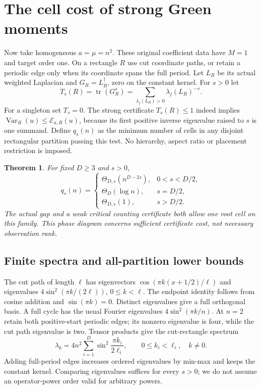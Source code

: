 \documentclass[11pt]{article}
\newtheorem{theorem}{Theorem}[section]
\newcommand{\Var}{\operatorname{Var}}
\newcommand{\tr}{\operatorname{tr}}
\newcommand{\E}{\mathcal E}
\begin{document}
\section{The cell cost of strong Green moments}
Now take homogeneous $a=\mu=n^2$. These original coefficient data have
$M=1$ and target order one. On a rectangle $R$ use cut coordinate paths,
or retain a periodic edge only when its coordinate spans the full period.
Let $L_R$ be its actual weighted Laplacian and $G_R=L_R^\dagger$, zero
on the constant kernel. For $s>0$ let
\[
 T_s(R)=\tr(G_R^s)=\sum_{\lambda_j(L_R)>0}\lambda_j(L_R)^{-s}.
\]
For a singleton set $T_s=0$. The strong certificate $T_s(R)\le1$ indeed
implies $\Var_R(u)\le\E_{a,R}(u)$, because its first positive inverse
eigenvalue raised to $s$ is one summand. Define $q_s(n)$ as the minimum
number of cells in any disjoint rectangular partition passing this test.
No hierarchy, aspect ratio or placement restriction is imposed.

\begin{theorem}\label{thm:green}
For fixed $D\ge3$ and $s>0$,
\[
 q_s(n)=
 \begin{cases}
 \Theta_{D,s}(n^{D-2s}),&0<s<D/2,\\
 \Theta_D(\log n),&s=D/2,\\
 \Theta_{D,s}(1),&s>D/2.
 \end{cases}
\]
The actual gap and a weak critical counting certificate both allow one
root cell on this family. This phase diagram concerns sufficient
certificate cost, not necessary observation rank.
\end{theorem}

\subsection{Finite spectra and all-partition lower bounds}
The cut path of length $\ell$ has eigenvectors
$\cos(\pi k(x+1/2)/\ell)$ and eigenvalues
$4\sin^2(\pi k/(2\ell))$, $0\le k<\ell$. The endpoint identity follows
from cosine addition and $\sin(\pi k)=0$. Distinct eigenvalues give a full
orthogonal basis. A full cycle has the usual Fourier eigenvalues
$4\sin^2(\pi k/n)$. At $n=2$ retain both positive-start periodic edges;
its nonzero eigenvalue is four, while the cut path eigenvalue is two.
Tensor products give the cut-rectangle spectrum
\begin{equation}\label{eq:spectrum}
 \lambda_k=4n^2\sum_{i=1}^D\sin^2\frac{\pi k_i}{2\ell_i},
 \qquad 0\le k_i<\ell_i,\quad k\ne0.
\end{equation}
Adding full-period edges increases ordered eigenvalues by min-max and keeps
the constant kernel. Comparing eigenvalues suffices for every $s>0$;
we do not assume an operator-power order valid for arbitrary powers.
\end{document}
